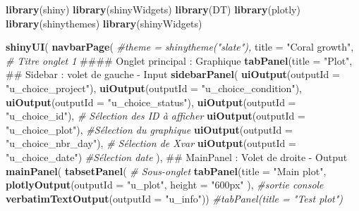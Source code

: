 \documentclass[]{report}
\newenvironment{Shaded}{\begin{snugshade}}{\end{snugshade}}
\newcommand{\KeywordTok}[1]{\textcolor[rgb]{0.13,0.29,0.53}{\textbf{#1}}}
\newcommand{\DataTypeTok}[1]{\textcolor[rgb]{0.13,0.29,0.53}{#1}}
\newcommand{\StringTok}[1]{\textcolor[rgb]{0.31,0.60,0.02}{#1}}
\newcommand{\CommentTok}[1]{\textcolor[rgb]{0.56,0.35,0.01}{\textit{#1}}}
\newcommand{\NormalTok}[1]{#1}
\begin{document}
\begin{Shaded}
\begin{Highlighting}[]
\KeywordTok{library}\NormalTok{(shiny)}
\KeywordTok{library}\NormalTok{(shinyWidgets)}
\KeywordTok{library}\NormalTok{(DT)}
\KeywordTok{library}\NormalTok{(plotly)}
\KeywordTok{library}\NormalTok{(shinythemes)}
\KeywordTok{library}\NormalTok{(shinyWidgets)}


\KeywordTok{shinyUI}\NormalTok{(}
  \KeywordTok{navbarPage}\NormalTok{(}
    \CommentTok{#theme = shinytheme("slate"),}
    \DataTypeTok{title =} \StringTok{"Coral growth"}\NormalTok{, }\CommentTok{# Titre onglet 1}
\NormalTok{    #### Onglet principal : Graphique}
    \KeywordTok{tabPanel}\NormalTok{(}\DataTypeTok{title =} \StringTok{"Plot"}\NormalTok{,}
\NormalTok{             ## Sidebar : volet de gauche - Input}
             \KeywordTok{sidebarPanel}\NormalTok{(}
               \KeywordTok{uiOutput}\NormalTok{(}\DataTypeTok{outputId =} \StringTok{"u_choice_project"}\NormalTok{),}
               \KeywordTok{uiOutput}\NormalTok{(}\DataTypeTok{outputId =} \StringTok{"u_choice_condition"}\NormalTok{),}
               \KeywordTok{uiOutput}\NormalTok{(}\DataTypeTok{outputId =} \StringTok{"u_choice_status"}\NormalTok{),}
               \KeywordTok{uiOutput}\NormalTok{(}\DataTypeTok{outputId =} \StringTok{"u_choice_id"}\NormalTok{), }\CommentTok{# Sélection des ID à afficher}
               \KeywordTok{uiOutput}\NormalTok{(}\DataTypeTok{outputId =} \StringTok{"u_choice_plot"}\NormalTok{),     }\CommentTok{#Sélection du graphique}
               \KeywordTok{uiOutput}\NormalTok{(}\DataTypeTok{outputId =} \StringTok{"u_choice_nbr_day"}\NormalTok{),      }\CommentTok{# Sélection de Xvar}
               \KeywordTok{uiOutput}\NormalTok{(}\DataTypeTok{outputId =} \StringTok{"u_choice_date"}\NormalTok{)              }\CommentTok{#Sélection date}
\NormalTok{             ),}
\NormalTok{             ## MainPanel : Volet de droite - Output}
             \KeywordTok{mainPanel}\NormalTok{(}
               \KeywordTok{tabsetPanel}\NormalTok{(}
                 \CommentTok{# Sous-onglet}
                 \KeywordTok{tabPanel}\NormalTok{(}\DataTypeTok{title =} \StringTok{"Main plot"}\NormalTok{,}
                          \KeywordTok{plotlyOutput}\NormalTok{(}\DataTypeTok{outputId =} \StringTok{"u_plot"}\NormalTok{, }\DataTypeTok{height =} \StringTok{"600px"}\NormalTok{ ),}
                          \CommentTok{#sortie console}
                          \KeywordTok{verbatimTextOutput}\NormalTok{(}\DataTypeTok{outputId =} \StringTok{"u_info"}\NormalTok{))}
                 \CommentTok{#tabPanel(title = "Test plot")}

\end{Highlighting}
\end{Shaded}
\end{document}
